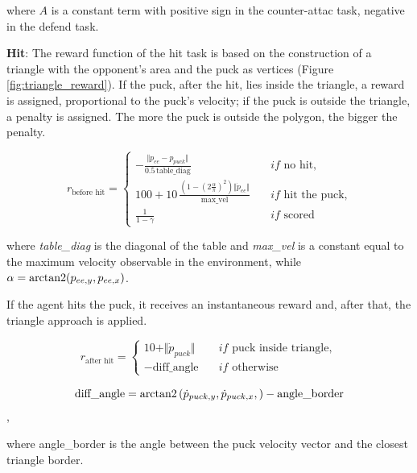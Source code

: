 where $A$ is a constant term with positive sign in the counter-attac task, negative in the defend task.

\textbf{Hit}:
The reward function of the hit task is based on the construction of a triangle with the opponent's area and the puck as vertices (Figure \ref{fig:triangle_reward}).
If the puck, after the hit, lies inside the triangle, a reward is assigned, proportional to the puck's velocity; if the puck is outside the triangle, a penalty is assigned.
The more the puck is outside the polygon, the bigger the penalty.

\begin{equation*}
    r_{\text{before hit}} = \left\{
        \begin{aligned}
            -\frac{\Vert p_{ee} - p_{puck} \Vert}{0.5 \, \text{table\_diag}} \quad &if \text{ no hit,} \\
            100 + 10\,\frac{\left(1 - \left(2\frac{\alpha}{\pi}\right)^2\right)\Vert \dot{p}_{ee} \Vert}{\text{max\_vel}} \quad &if \text{ hit the puck,} \\
            \frac{1}{1 - \gamma} \quad &if \text{ scored}
        \end{aligned}
    \right.
\end{equation*}

where \textit{table\_diag} is the diagonal of the table and \textit{max\_vel} is a constant equal to the maximum velocity observable in the environment,
while $\alpha = \operatorname{arctan2}(p_{ee,y}, p_{ee,x})$.

If the agent hits the puck, it receives an instantaneous reward and, after that, the triangle approach is applied.

\begin{equation*}
    r_{\text{after hit}} = \left\{
        \begin{aligned}
            10 + \Vert \dot{p}_{puck} \Vert \quad  &if \text{ puck inside triangle}, \\
            -\text{diff\_angle} \quad              &if \text{ otherwise} 
        \end{aligned}
    \right.
    \end{equation*}


\begin{equation*}
    \text{diff\_angle} = \operatorname{arctan2}\left(\dot{p}_{puck,y},\dot{p}_{puck,x}, \right) - \text{angle\_border}
\end{equation*},

where angle\_border is the angle between the puck velocity vector and the closest triangle border.

